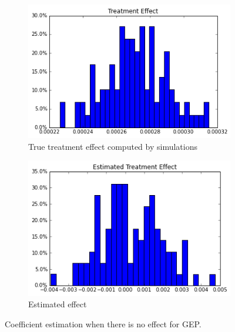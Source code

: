 \documentclass[11pt]{article}
\begin{document}
\begin{figure}[h]
\centering
\begin{subfigure}{.5\textwidth}
  \centering
  \includegraphics[width=.9\linewidth]{treatment_effect_no_influence.png}
  \caption{True treatment effect computed by simulations}
  \label{fig:sub1}
\end{subfigure}%
\begin{subfigure}{.5\textwidth}
  \centering
  \includegraphics[width=.9\linewidth]{estimated_no_influence.png}
  \caption{Estimated effect}
  \label{fig:sub2}
\end{subfigure}
\caption{Coefficient estimation when there is no effect for GEP.}
\label{fig:small_effect_gps}
\end{figure}
\end{document}

